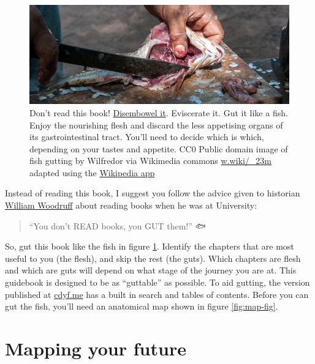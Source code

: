 \documentclass[
]{book}
\begin{document}
\begin{figure}

{\centering \includegraphics[width=1\linewidth]{images/fish-gutting} 

}

\caption{Don't read this book! \href{https://en.wikipedia.org/wiki/Disembowelment}{Disembowel it}. Eviscerate it. Gut it like a fish. Enjoy the nourishing flesh and discard the less appetising organs of its gastrointestinal tract. You'll need to decide which is which, depending on your tastes and appetite. CC0 Public domain image of fish gutting by Wilfredor via Wikimedia commons \href{https://w.wiki/_23m}{w.wiki/\_23m} adapted using the \href{https://apps.apple.com/gb/app/wikipedia/id324715238}{Wikipedia app}}\label{fig:gut-fig}
\end{figure}



Instead of reading this book, I suggest you follow the advice given to historian \href{https://en.wikipedia.org/wiki/William_Woodruff}{William Woodruff} about reading books when he was at University:

\begin{quote}
``You don't READ books, you GUT them!'' \citep{nabend} 🐟
\end{quote}

So, gut this book like the fish in figure \ref{fig:gut-fig}. Identify the chapters that are most useful to you (the flesh), and skip the rest (the guts). Which chapters are flesh and which are guts will depend on what stage of the journey you are at. This guidebook is designed to be as ``guttable'' as possible. To aid gutting, the version published at \href{https://www.cdyf.me/}{cdyf.me} has a built in search and tables of contents. Before you can gut the fish, you'll need an anatomical map shown in figure \ref{fig:map-fig}.

\hypertarget{mapping}{%
\section{Mapping your future}\label{mapping}}
\end{document}
